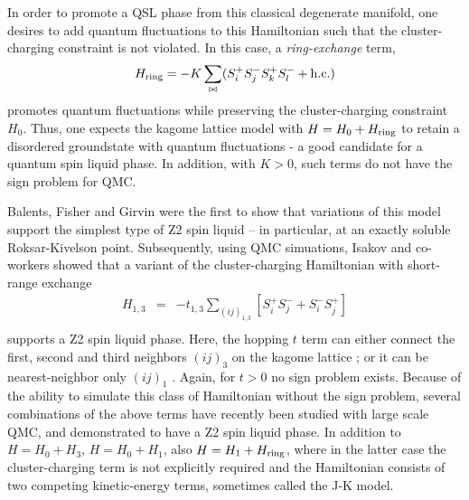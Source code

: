 \documentclass[range]{ar2e}
\begin{document}
In order to promote a QSL phase from this classical degenerate manifold, one desires to add quantum fluctuations to this Hamiltonian such that the cluster-charging constraint is not violated.  In this case, a {\it ring-exchange} term, 
\begin{eqnarray}
H_{\rm ring} = -K \sum_{\bowtie} ( S_i^{+} S_j^{-} S_k^{+} S_l^{-} + {\rm h.c.} )
\end{eqnarray} 
promotes quantum fluctuations while preserving the cluster-charging constraint $H_0$.  Thus, one expects the kagome lattice model with $H = H_0 + H_{\rm ring}$ to retain a disordered groundstate with quantum fluctuations - a good candidate for a quantum spin liquid phase.  In addition, with $K>0$, such terms do not have the sign problem for QMC.

Balents, Fisher and Girvin \cite{BFG} were the first to show that variations of this model support the simplest type of Z2 spin liquid -- in particular, at an exactly soluble Roksar-Kivelson point.  Subsequently, using QMC simuations, Isakov and co-workers showed that a variant of the cluster-charging Hamiltonian with short-range exchange 
\begin{eqnarray}
H_{1,3} &=& -t_{1,3} \sum_{( ij )_{1,3}} [S^{+}_i S^-_j + S^-_i S^{+}_j]  \\
\end{eqnarray}
supports a Z2 spin liquid phase.  Here, the hopping $t$ term can either connect the first, second and third neighbors $( ij )_3$ on the kagome lattice \cite{Isakov1,Isakov2}; or it can be nearest-neighbor only $( ij )_1$ \cite{TopoEE}.  Again, for $t>0$ no sign problem exists.
Because of the ability to simulate this class of Hamiltonian without the sign problem, several combinations of the above terms have recently been studied with large scale QMC, and demonstrated to have a Z2 spin liquid phase.  In addition to  $H = H_0 + H_3$, $H = H_0 + H_1$, also $H = H_1 + H_{\rm ring}$, where in the latter case the cluster-charging term is not explicitly required and the Hamiltonian consists of two competing kinetic-energy terms, sometimes called the J-K model.

\end{document}
